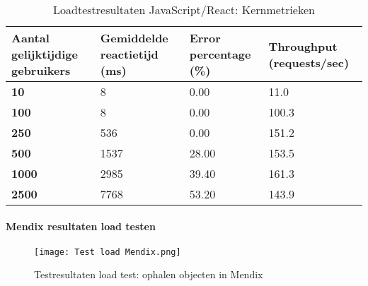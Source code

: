 \begin{table}[h]
    \centering
    \begin{tabular}{ |p{5cm}|p{3cm}|p{3cm}|p{3cm}|}
        \hline
        \textbf{Aantal gelijktijdige \newline gebruikers} & \textbf{Gemiddelde reactietijd (ms)} & \textbf{Error \newline percentage (\%)} & \textbf{Throughput (requests/sec)}\\
        \hline
        \textbf{10}  & 8 & 0.00 & 11.0 \\
        \hline
        \textbf{100} & 8 & 0.00 & 100.3 \\
        \hline
        \textbf{250}  & 536 & 0.00 & 151.2 \\
        \hline
        \textbf{500}  & 1537 & 28.00 & 153.5 \\
        \hline                       
        \textbf{1000}  & 2985 & 39.40 & 161.3  \\
        \hline
        \textbf{2500}  & 7768 & 53.20 & 143.9 \\
        \hline
    \end{tabular}
    \caption[\centering Loadtestresultaten JavaScript/React: Kernmetrieken]{\label{tab:Testresultaten JS loadtest}Loadtestresultaten JavaScript/React: Kernmetrieken}
\end{table}


\paragraph{Mendix resultaten load testen}

\begin{figure}[H]
    \centering
    \captionsetup{justification=centering}
    \texttt{[image: Test load Mendix.png]}
    \caption[\centering Testresultaten load test: ophalen objecten in Mendix]{\label{fig:loadtest-Mendix} Testresultaten load test: ophalen objecten in Mendix}
\end{figure}


